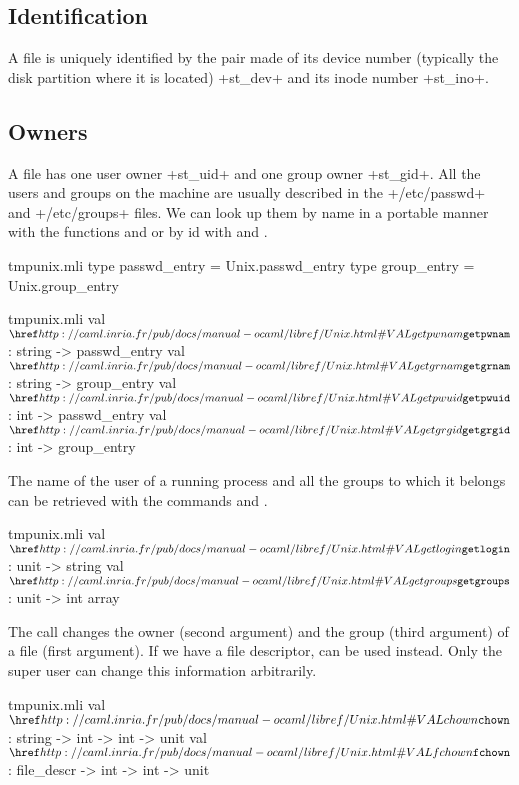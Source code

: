 \subsection*{Identification}

A file is uniquely identified by the pair made of its device number
(typically the disk partition where it is located) \ml+st_dev+ and its
inode number \ml+st_ino+.

\subsection*{Owners}

A file has one user owner \ml+st_uid+ and one group owner
\ml+st_gid+.  All the users and groups 
on the machine are usually described in the  
 \ml+/etc/passwd+ and \ml+/etc/groups+ files. We can look up them by
name in a portable manner with the functions  and 
 or by id with 
 and .
%
\begin{codefile}{tmpunix.mli}
type passwd_entry = Unix.passwd_entry
type group_entry = Unix.group_entry
\end{codefile}
%
\begin{listingcodefile}{tmpunix.mli}
val $\libvalue{Unix}{getpwnam}$ : string -> passwd_entry
val $\libvalue{Unix}{getgrnam}$ : string -> group_entry
val $\libvalue{Unix}{getpwuid}$ : int -> passwd_entry
val $\libvalue{Unix}{getgrgid}$ : int -> group_entry
\end{listingcodefile}

The name of the user of a running process and all the groups
to which it belongs can be retrieved with the commands
 and .
%
\begin{listingcodefile}{tmpunix.mli}
val $\libvalue{Unix}{getlogin}$ : unit -> string
val $\libvalue{Unix}{getgroups}$ : unit -> int array
\end{listingcodefile}

The call  changes the owner (second argument) and the
group (third argument) of a file (first argument). If we have a file
descriptor,  can be used instead. Only the super user
can change this information arbitrarily.
%
\begin{listingcodefile}{tmpunix.mli}
val $\libvalue{Unix}{chown}$ : string -> int -> int -> unit
val $\libvalue{Unix}{fchown}$ : file_descr -> int -> int -> unit
\end{listingcodefile}

